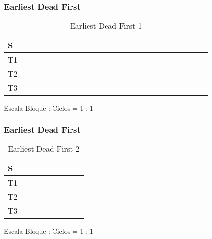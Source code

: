 \documentclass[xcolor=table]{beamer}
\begin{document}
\begin{frame} 
\frametitle{ Earliest Dead First } 
\begin{table} 
\centering 
\begin{tabular}{|l|l|l|l|l|l|l|l|l|l|l|l|l|l|l|l|l|l|l|l|l|l|l|l|l|} 
\hline 
S & \cellcolor{green} & \cellcolor{green} & \cellcolor{green} & \cellcolor{green} & \cellcolor{green} & \cellcolor{green} & \cellcolor{green} & \cellcolor{green} & \cellcolor{green} & \cellcolor{green} & \cellcolor{green} & \cellcolor{green} & \cellcolor{green} & \cellcolor{green} & \cellcolor{green} & \cellcolor{green} & \cellcolor{green} & \cellcolor{green} & \cellcolor{green} & \cellcolor{green} & \cellcolor{green} & \cellcolor{green} & \cellcolor{green} & \cellcolor{green} \\ \hline 
T1 & & & & & & & & & & & & & & & & & & & & & & & & \\ \hline 
T2 & & & & & & \cellcolor{red} & \cellcolor{red} & \cellcolor{red} & \cellcolor{red} & \cellcolor{red} & \cellcolor{red} & \cellcolor{red} & \cellcolor{red} & \cellcolor{red} & \cellcolor{red} & \cellcolor{red} & \cellcolor{red} & \cellcolor{red} & \cellcolor{red} & \cellcolor{red} & \cellcolor{red} & \cellcolor{red} & \cellcolor{red} & \cellcolor{red} \\ \hline 
T3 & \cellcolor{green} & \cellcolor{green} & \cellcolor{green} & \cellcolor{green} & \cellcolor{green} & & & & & & & & & & & & & & & & & & & \\ \hline 
\end{tabular} 
\caption{ Earliest Dead First 1 } 
\end{table} 
Escala Bloque : Ciclos = 1 : 1 
\end{frame} 
\begin{frame} 
\frametitle{ Earliest Dead First } 
\begin{table} 
\centering 
\begin{tabular}{|l|l|l|l|l|l|l|l|l|} 
\hline 
S & \cellcolor{green} & \cellcolor{green} & \cellcolor{green} & \cellcolor{green} & \cellcolor{green} & \cellcolor{green} & \cellcolor{green} & \cellcolor{green} \\ \hline 
T1 & & \cellcolor{blue} & \cellcolor{blue} & \cellcolor{blue} & \cellcolor{blue} & \cellcolor{blue} & \cellcolor{blue} & \cellcolor{blue} \\ \hline 
T2 & \cellcolor{red} & & & & & & & \\ \hline 
T3 & & & & & & & & \\ \hline 
\end{tabular} 
\caption{ Earliest Dead First 2 } 
\end{table} 
Escala Bloque : Ciclos = 1 : 1 
\end{frame} 
\end{document}
